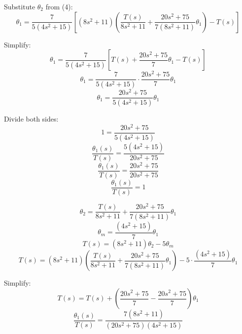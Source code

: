 Substitute \( \theta_2 \) from (4):
\[
\theta_1 = \frac{7}{5(4s^2 + 15)} \left[ (8s^2 + 11)\left( \frac{T(s)}{8s^2 + 11} + \frac{20s^2 + 75}{7(8s^2 + 11)} \theta_1 \right) - T(s) \right]
\]

Simplify:
\[
\theta_1 = \frac{7}{5(4s^2 + 15)} \left[ T(s) + \frac{20s^2 + 75}{7} \theta_1 - T(s) \right]
\]
\[
\theta_1 = \frac{7}{5(4s^2 + 15)} \cdot \frac{20s^2 + 75}{7} \theta_1
\]
\[
\theta_1 = \frac{20s^2 + 75}{5(4s^2 + 15)} \theta_1
\]

Divide both sides:
\[
1 = \frac{20s^2 + 75}{5(4s^2 + 15)}
\]
\[
\frac{\theta_1(s)}{T(s)} = \frac{5(4s^2 + 15)}{20s^2 + 75}
\]
\[
\frac{\theta_1(s)}{T(s)}= \frac{20s^2 + 75}{20s^2 + 75}
\]
\[
\frac{\theta_1(s)}{T(s)}= 1
\]

\[
\theta_2 = \frac{T(s)}{8s^2 + 11} + \frac{20s^2 + 75}{7(8s^2 + 11)} \theta_1
\]
\[
\theta_m = \frac{(4s^2 + 15)}{7} \theta_1
\]
\[
T(s) = (8s^2 + 11)\theta_2 - 5\theta_m
\]
\[
T(s)= (8s^2 + 11)\left( \frac{T(s)}{8s^2 + 11} + \frac{20s^2 + 75}{7(8s^2 + 11)} \theta_1 \right) - 5 \cdot \frac{(4s^2 + 15)}{7} \theta_1
\]

Simplify:
\[
T(s) = T(s) + \left( \frac{20s^2 + 75}{7} - \frac{20s^2 + 75}{7} \right) \theta_1
\]
\[
\boxed{
\frac{\theta_1(s)}{T(s)} = \frac{7(8s^2 + 11)}{(20s^2 + 75)(4s^2 + 15)}
}
\]


\newpage

